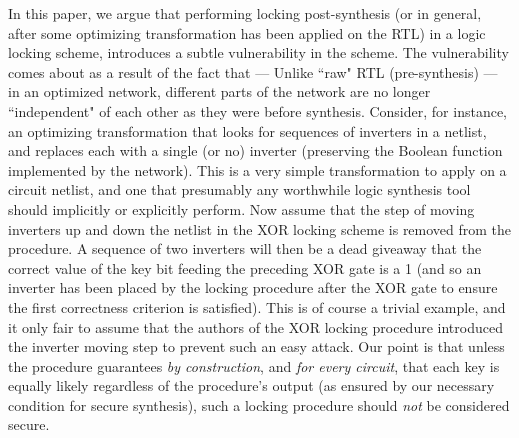 In this paper, we argue that performing locking post-synthesis (or in general, after some optimizing transformation has been applied on the RTL) in a logic locking scheme, introduces a subtle vulnerability in the scheme. The vulnerability comes about as a result of the fact that --- Unlike ``raw" RTL (pre-synthesis) --- in an optimized network, different parts of the network are no longer ``independent" of each other as they were before synthesis. Consider, for instance, an optimizing transformation that looks for sequences of inverters in a netlist, and replaces each with a single (or no) inverter (preserving the Boolean function implemented by the network). This is a very simple transformation to apply on a circuit netlist, and one that presumably any worthwhile logic synthesis tool should implicitly or explicitly perform. Now assume that the step of moving inverters up and down the netlist in the XOR locking scheme is removed from the procedure. A sequence of two inverters will then be a dead giveaway that the correct value of the key bit feeding the preceding XOR gate is a 1 (and so an inverter has been placed by the locking procedure after the XOR gate to ensure the first correctness criterion is satisfied). This is of course a trivial example, and it only fair to assume that the authors of the XOR locking procedure introduced the inverter moving step to prevent such an easy attack. Our point is that unless the procedure guarantees \emph{by construction}, and \emph{for every circuit}, that each key is equally likely regardless of the procedure's output (as ensured by our necessary condition for secure synthesis), such a locking procedure should \emph{not} be considered secure.